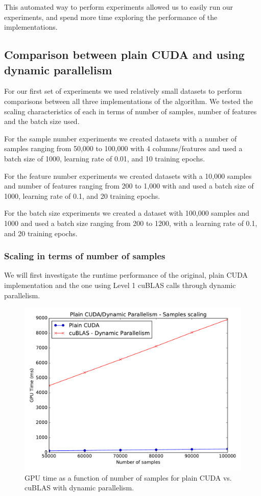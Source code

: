 \documentclass[11pt,a4paper]{article}
\begin{document}
This automated way to perform experiments allowed us to easily run our experiments, and
spend more time exploring the performance of the implementations.


\subsection{Comparison between plain CUDA and using dynamic parallelism}

For our first set of experiments we used relatively small datasets to perform comparisons
between all three implementations of the algorithm. We tested the scaling characteristics
of each in terms of number of samples, number of features and the batch size used.

For the sample number experiments we created datasets with a number of samples ranging
from 50,000 to 100,000 with 4 columns/features and used a batch size of 1000, learning rate of 0.01,
and 10 training epochs.

For the feature number experiments we created datasets with a 10,000 samples and number of features ranging
from 200 to 1,000 with and used a batch size of 1000, learning rate of 0.1,
and 20 training epochs.

For the batch size experiments we created a dataset with 100,000 samples and 1000 
and used a batch size ranging from 200 to 1200, with a learning rate of 0.1,
and 20 training epochs.


\subsubsection*{Scaling in terms of number of samples}


We will first investigate the runtime performance
of the original, plain CUDA implementation and the one using Level 1 cuBLAS
calls through dynamic parallelism.


\begin{figure}[H]
	\centering
	\includegraphics[width=0.8\linewidth]{gpu_plain_vs_Lvl1cuBLAS-50k-100k.pdf}
	\caption{GPU time as a function of number of samples for plain CUDA vs. cuBLAS with dynamic parallelism.}
	\label{fig:plain-dpar-n-samples}
\end{figure}
\end{document}
